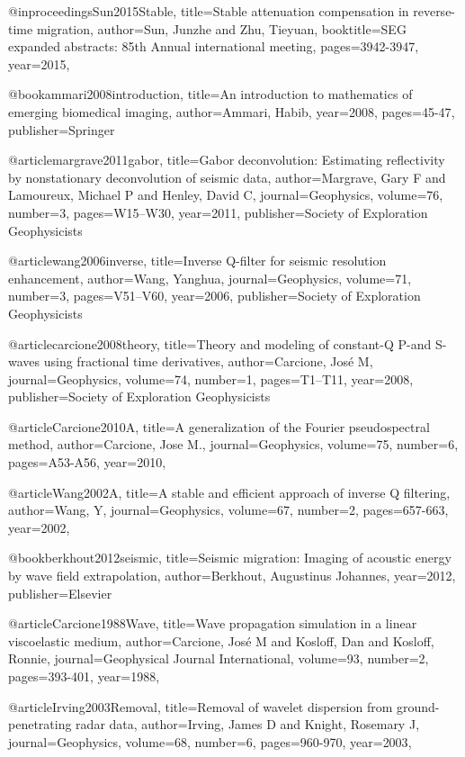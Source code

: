 {@inproceedings{Sun2015Stable,
  title={Stable attenuation compensation in reverse-time migration},
  author={Sun, Junzhe and Zhu, Tieyuan},
  booktitle={SEG expanded abstracts: 85th Annual international meeting},
  pages={3942-3947},
  year={2015},
}

@book{ammari2008introduction,
  title={An introduction to mathematics of emerging biomedical imaging},
  author={Ammari, Habib},
  year={2008},
  pages={45-47},
  publisher={Springer}
}


@article{margrave2011gabor,
  title={Gabor deconvolution: Estimating reflectivity by nonstationary deconvolution of seismic data},
  author={Margrave, Gary F and Lamoureux, Michael P and Henley, David C},
  journal={Geophysics},
  volume={76},
  number={3},
  pages={W15--W30},
  year={2011},
  publisher={Society of Exploration Geophysicists}
}

@article{wang2006inverse,
  title={Inverse {Q}-filter for seismic resolution enhancement},
  author={Wang, Yanghua},
  journal={Geophysics},
  volume={71},
  number={3},
  pages={V51--V60},
  year={2006},
  publisher={Society of Exploration Geophysicists}
}

@article{carcione2008theory,
  title={Theory and modeling of constant-{Q} {P}-and {S}-waves using fractional time derivatives},
  author={Carcione, Jos{\'e} M},
  journal={Geophysics},
  volume={74},
  number={1},
  pages={T1--T11},
  year={2008},
  publisher={Society of Exploration Geophysicists}
}


@article{Carcione2010A,
  title={A generalization of the Fourier pseudospectral method},
  author={Carcione, Jose M.},
  journal={Geophysics},
  volume={75},
  number={6},
  pages={A53-A56},
  year={2010},
}

@article{Wang2002A,
  title={A stable and efficient approach of inverse {Q} filtering},
  author={Wang, Y},
  journal={Geophysics},
  volume={67},
  number={2},
  pages={657-663},
  year={2002},
}

@book{berkhout2012seismic,
  title={Seismic migration: Imaging of acoustic energy by wave field extrapolation},
  author={Berkhout, Augustinus Johannes},
  year={2012},
  publisher={Elsevier}
}

@article{Carcione1988Wave,
  title={Wave propagation simulation in a linear viscoelastic medium},
  author={Carcione, José M and Kosloff, Dan and Kosloff, Ronnie},
  journal={Geophysical Journal International},
  volume={93},
  number={2},
  pages={393-401},
  year={1988},
}

@article{Irving2003Removal,
  title={Removal of wavelet dispersion from ground-penetrating radar data},
  author={Irving, James D and Knight, Rosemary J},
  journal={Geophysics},
  volume={68},
  number={6},
  pages={960-970},
  year={2003},
}

}
